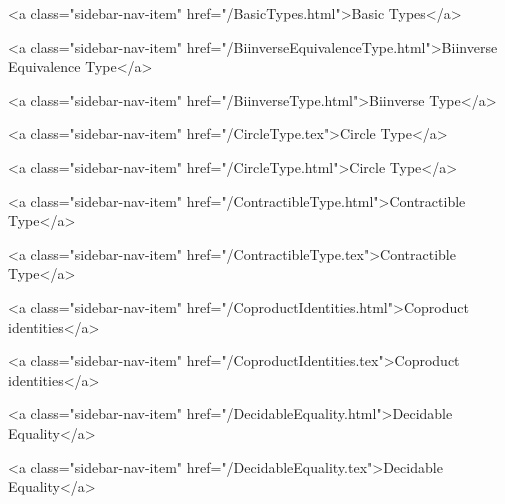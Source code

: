           <a class="sidebar-nav-item" href="/BasicTypes.html">Basic Types</a>
        
      
    
      
        
          <a class="sidebar-nav-item" href="/BiinverseEquivalenceType.html">Biinverse Equivalence Type</a>
        
      
    
      
        
          <a class="sidebar-nav-item" href="/BiinverseType.html">Biinverse Type</a>
        
      
    
      
        
          <a class="sidebar-nav-item" href="/CircleType.tex">Circle Type</a>
        
      
    
      
        
          <a class="sidebar-nav-item" href="/CircleType.html">Circle Type</a>
        
      
    
      
        
          <a class="sidebar-nav-item" href="/ContractibleType.html">Contractible Type</a>
        
      
    
      
        
          <a class="sidebar-nav-item" href="/ContractibleType.tex">Contractible Type</a>
        
      
    
      
        
          <a class="sidebar-nav-item" href="/CoproductIdentities.html">Coproduct identities</a>
        
      
    
      
        
          <a class="sidebar-nav-item" href="/CoproductIdentities.tex">Coproduct identities</a>
        
      
    
      
        
          <a class="sidebar-nav-item" href="/DecidableEquality.html">Decidable Equality</a>
        
      
    
      
        
          <a class="sidebar-nav-item" href="/DecidableEquality.tex">Decidable Equality</a>
        
      
    
